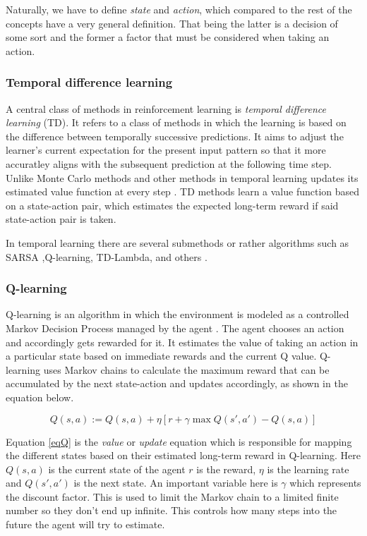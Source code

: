 Naturally, we have to define \textit{state} and \textit{action}, which compared to the rest of the concepts have a very general definition. That being the latter is a decision of some sort and the former a factor that must be considered when taking an action. 

\subsubsection{Temporal difference learning}

A central class of methods in reinforcement learning is \textit{temporal difference learning} (TD). It refers to a class of methods in which the learning is based on the difference between temporally successive predictions. It aims to adjust the learner's current expectation for the present input pattern so that it more accuratley aligns with the subsequent prediction at the following time step. Unlike Monte Carlo methods and other methods in temporal learning updates its estimated value function at every step \cite{tesauro1995temporal}.  TD methods learn a value function based on a state-action pair, which estimates the expected long-term reward if said state-action pair is taken. 

In temporal learning there are several submethods or rather algorithms such as SARSA ,Q-learning, TD-Lambda, and others \cite{eiben2007reinforcement}.\\

\subsubsection{Q-learning}
Q-learning is an algorithm in which the environment is modeled as a controlled Markov Decision Process managed by the agent \cite{watkins1992q}. The agent chooses an action and accordingly gets rewarded for it. It estimates the value of taking an action in a particular state based on immediate rewards and the current Q value. Q-learning uses Markov chains to calculate the maximum reward that can be accumulated by the next state-action and updates accordingly, as shown in the equation below.

\begin{equation} \label{eqQ}
    { Q(s,a) := Q(s,a) + \eta [r + \gamma \max Q(s',a') - Q(s,a)]}
\end{equation}

Equation \ref{eqQ} is the \textit{value} or \textit{update} equation which is responsible for mapping the different states based on their estimated long-term reward in Q-learning. Here $Q(s,a)$ is the current state of the agent $r$ is the reward, $\eta$ is the learning rate and $Q(s',a')$ is the next state. An important variable here is $\gamma$ which represents the discount factor. This is used to limit the Markov chain to a limited finite number so they don't end up infinite. This controls how many steps into the future the agent will try to estimate. 



